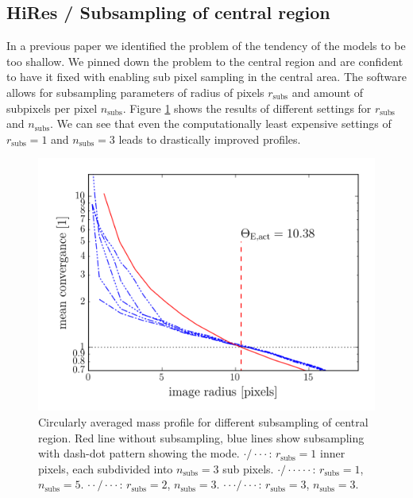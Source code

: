 \documentclass[fleqn,usenatbib]{mnras}
\newcommand{\figref}[1]{Figure \ref{fig:#1}}
\begin{document}
\subsection{HiRes / Subsampling of central region}
In a previous paper \cite{2015MNRAS.447.2170K} we identified the problem of the tendency of the models to be too shallow.
We pinned down the problem to the central region and are confident to have it fixed with enabling sub pixel sampling in the central area.
The software allows for subsampling parameters of radius of pixels $r_\text{subs}$ and amount of subpixels per pixel $n_\text{subs}$.
\figref{subsampling} shows the results of different settings for $r_\text{subs}$ and $n_\text{subs}$.
We can see that even the computationally least expensive settings of $r_\text{subs}=1$ and $n_\text{subs}=3$ leads to drastically improved profiles.

\begin{figure}
  \includegraphics[width=\linewidth]{hires/007022_kappa_encl}
  \caption{
    Circularly averaged mass profile for different subsampling of central region.
    Red line without subsampling, blue lines show subsampling with dash-dot pattern showing the mode.
    $\cdot / \cdot \cdot \cdot$: $r_\text{subs}=1$ inner pixels, each subdivided into $n_\text{subs}=3$ sub pixels.
    $\cdot / \cdot \cdot \cdot \cdot \cdot$: $r_\text{subs}=1$, $n_\text{subs}=5$.
    $\cdot \cdot / \cdot \cdot \cdot $: $r_\text{subs}=2$, $n_\text{subs}=3$.
    $\cdot \cdot \cdot / \cdot \cdot \cdot $: $r_\text{subs}=3$, $n_\text{subs}=3$.
    }
  \label{fig:subsampling}
\end{figure}
\end{document}
